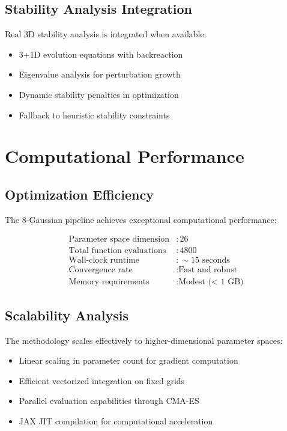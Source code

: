 \documentclass[11pt,a4paper]{article}
\begin{document}
\subsection{Stability Analysis Integration}

Real 3D stability analysis is integrated when available:
\begin{itemize}
\item 3+1D evolution equations with backreaction
\item Eigenvalue analysis for perturbation growth
\item Dynamic stability penalties in optimization
\item Fallback to heuristic stability constraints
\end{itemize}

\section{Computational Performance}

\subsection{Optimization Efficiency}

The 8-Gaussian pipeline achieves exceptional computational performance:

\begin{align}
\text{Parameter space dimension} &: 26 \\
\text{Total function evaluations} &: 4800 \\
\text{Wall-clock runtime} &: \sim 15 \text{ seconds} \\
\text{Convergence rate} &: \text{Fast and robust} \\
\text{Memory requirements} &: \text{Modest (< 1 GB)}
\end{align}

\subsection{Scalability Analysis}

The methodology scales effectively to higher-dimensional parameter spaces:
\begin{itemize}
\item Linear scaling in parameter count for gradient computation
\item Efficient vectorized integration on fixed grids
\item Parallel evaluation capabilities through CMA-ES
\item JAX JIT compilation for computational acceleration
\end{itemize}
\end{document}
